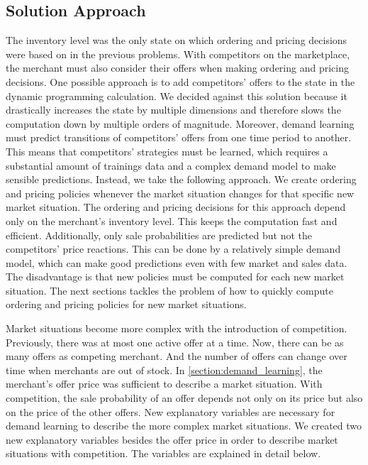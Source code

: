 \subsection{Solution Approach}




The inventory level was the only state on which ordering and pricing decisions were based on in the previous problems.
With competitors on the marketplace, the merchant must also consider their offers when making ordering and pricing decisions.
One possible approach is to add competitors' offers to the state in the dynamic programming calculation.
We decided against this solution because it drastically increases the state by multiple dimensions and therefore slows the computation down by multiple orders of magnitude.
Moreover, demand learning must predict transitions of competitors' offers from one time period to another.
This means that competitors' strategies must be learned, which requires a substantial amount of trainings data and a complex demand model to make sensible predictions.
Instead, we take the following approach.
We create ordering and pricing policies whenever the market situation changes for that specific new market situation.
The ordering and pricing decisions for this approach depend only on the merchant's inventory level.
This keeps the computation fast and efficient.
Additionally, only sale probabilities are predicted but not the competitors' price reactions.
This can be done by a relatively simple demand model, which can make good predictions even with few market and sales data.
The disadvantage is that new policies must be computed for each new market situation.
The next sections tackles the problem of how to quickly compute ordering and pricing policies for new market situations.

Market situations become more complex with the introduction of competition.
Previously, there was at most one active offer at a time.
Now, there can be as many offers as competing merchant.
And the number of offers can change over time when merchants are out of stock.
In \cref{section:demand_learning}, the merchant's offer price was sufficient to describe a market situation.
With competition, the sale probability of an offer depends not only on its price but also on the price of the other offers.
New explanatory variables are necessary for demand learning to describe the more complex market situations.
We created two new explanatory variables besides the offer price in order to describe market situations with competition.
The variables are explained in detail below.

